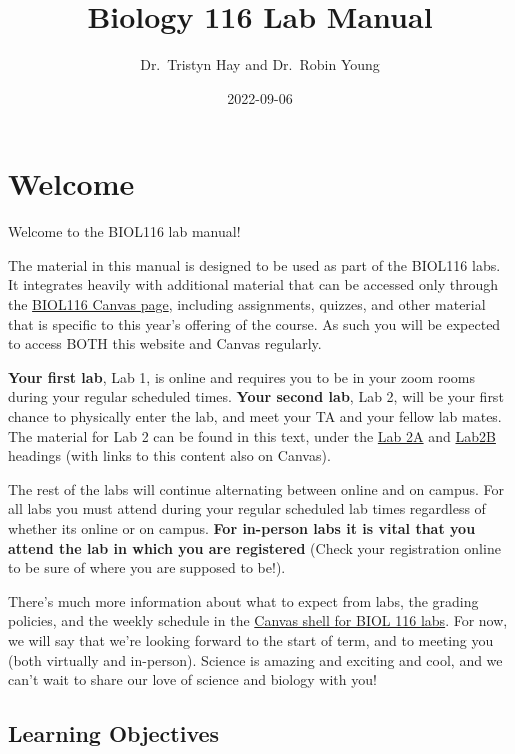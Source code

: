 \documentclass[
]{book}
\title{Biology 116 Lab Manual}
\author{Dr.~Tristyn Hay and Dr.~Robin Young}
\date{2022-09-06}
\begin{document}
\maketitle

{
\setcounter{tocdepth}{1}
\tableofcontents
}
\hypertarget{welcome}{%
\chapter*{Welcome}\label{welcome}}

Welcome to the BIOL116 lab manual!

The material in this manual is designed to be used as part of the BIOL116 labs. It integrates heavily with additional material that can be accessed only through the \href{https://canvas.ubc.ca/courses/94572}{BIOL116 Canvas page}, including assignments, quizzes, and other material that is specific to this year's offering of the course. As such you will be expected to access BOTH this website and Canvas regularly.

\textbf{Your first lab}, Lab 1, is online and requires you to be in your zoom rooms during your regular scheduled times. \textbf{Your second lab}, Lab 2, will be your first chance to physically enter the lab, and meet your TA and your fellow lab mates. The material for Lab 2 can be found in this text, under the \href{https://ubco-biology.github.io/BIOL-116-Lab-Manual/the-process-of-science.html}{Lab 2A} and \href{https://ubco-biology.github.io/BIOL-116-Lab-Manual/research-project.html}{Lab2B} headings (with links to this content also on Canvas).

The rest of the labs will continue alternating between online and on campus. For all labs you must attend during your regular scheduled lab times regardless of whether its online or on campus. \textbf{For in-person labs it is vital that you attend the lab in which you are registered} (Check your registration online to be sure of where you are supposed to be!).

There's much more information about what to expect from labs, the grading policies, and the weekly schedule in the \href{https://canvas.ubc.ca}{Canvas shell for BIOL 116 labs}. For now, we will say that we're looking forward to the start of term, and to meeting you (both virtually and in-person). Science is amazing and exciting and cool, and we can't wait to share our love of science and biology with you!

\hypertarget{learning-objectives}{%
\section*{Learning Objectives}\label{learning-objectives}}
\end{document}
